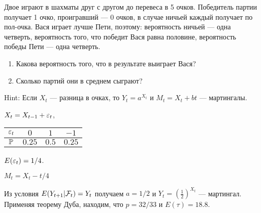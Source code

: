 \begin{problem}
Двое играют в шахматы друг с другом до перевеса в 5 очков. Победитель партии получает 1 очко, проигравший --- 0 очков, в случае ничьей каждый получает по пол-очка. Вася играет лучше Пети, поэтому: вероятность ничьей --- одна четверть, вероятность того, что победит Вася равна половине, вероятность победы Пети --- одна четверть. 
\begin{enumerate}
\item Какова вероятность того, что в результате выиграет Вася? 
\item Сколько партий они в среднем сыграют? 
\end{enumerate}

\end{problem} 
\begin{solution} 

Hint:  Если $X_{t}$ --- разница в очках, то $Y_t=a^{X_{t}}$ и $M_t=X_{t}+bt$ --- мартингалы. 

$X_t=X_{t-1}+\e_t$,

\begin{tabular}{cccc}
$\e_t$ & $0$ & $1$ & $-1$ \\ 
\hline 
$\P$ & $0.25$ & $0.5$ & $0.25$ \\ 
\end{tabular} 

$E(\e_t)=1/4$.

$M_t=X_t-t/4$

Из условия $E(Y_{t+1}|\cF_t)=Y_t$ получаем $a=1/2$ и $Y_t=\left( \frac{1}{2} \right)^{X_t}$ --- мартингал. Применяя теорему Дуба, находим, что $p=32/33$ и $E(\tau)=18.8$.


\end{solution}

